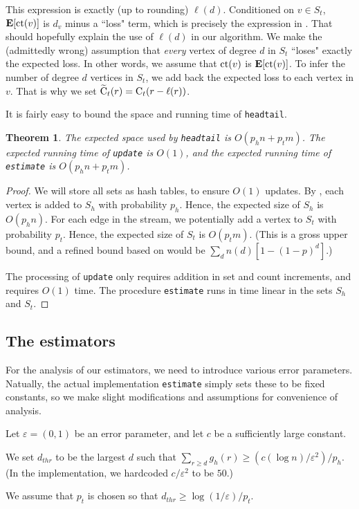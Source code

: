 \documentclass[11pt]{article}
\newtheorem{theorem}{Theorem}
\theoremstyle{definition}
\newcommand{\EX}{\hbox{\bf E}}
\def\eps{\varepsilon}
\newcommand{\C}{\hbox{C}}
\newcommand{\tC}{\widetilde{\hbox{C}}}
\newcommand{\ct}{\hbox{ct}}
\newcommand{\degdist}{{\tt headtail}}
\newcommand{\update}{{\tt update}}
\newcommand{\est}{{\tt estimate}}
\begin{document}
This expression is exactly (up to rounding) $\ell(d)$.
Conditioned on $v \in S_t$, $\EX[\ct(v)]$ is $d_v$ minus a ``loss" term, which is precisely
the expression in . That should hopefully explain the use of $\ell(d)$ in our algorithm.
We make the (admittedly wrong) assumption that \emph{every} vertex of degree $d$ in $S_t$
``loses" exactly the expected loss. In other words, we assume that $\ct(v)$ is $\EX[\ct(v)]$.
To infer the number of degree $d$ vertices in $S_t$, we add back the expected loss
to each vertex in $v$. That is why we set $\tC_t(r) = \C_t(r-\ell(r))$.

\medskip

It is fairly easy to bound the space and running time of \degdist.

\begin{theorem} \label{thm:time} The expected space used by \degdist{} is $O(p_h n + p_t m)$.
The expected running time of \update{} is $O(1)$, and the expected running time of \est{} is $O(p_h n + p_t m)$.
\end{theorem}

\begin{proof} We will store all sets as hash tables, to ensure $O(1)$ updates.
By , each vertex is added to $S_h$ with probability $p_h$. Hence, the expected size
of $S_h$ is $O(p_h n)$. For each edge in the stream, we potentially add a vertex
to $S_t$ with probability $p_t$. Hence, the expected size of $S_t$ is $O(p_t m)$. (This is a gross
upper bound, and a refined bound based on  would be $\sum_d n(d) [1-(1-p)^d]$.)

The processing of \update{} only requires addition in set and count increments,
and requires $O(1)$ time. The procedure \est{} runs in time linear in the sets $S_h$ and $S_t$.
\end{proof}


\subsection{The estimators} \label{sec:est}

For the analysis of our estimators, we need to introduce various error parameters. Natually,
the actual implementation \est{} simply sets these to be fixed constants, so we make
slight modifications and assumptions for convenience of analysis.

Let $\eps = (0,1)$ be an error parameter, and let $c$ be a sufficiently large constant.
\begin{asparaitem}
    \item We set $d_{thr}$ to be the largest $d$ such that $\sum_{r \geq d} g_h(r) \geq (c(\log n)/\eps^2)/p_h$.
    (In the implementation, we hardcoded $c/\eps^2$ to be $50$.)
    \item We assume that $p_t$ is chosen so that $d_{thr} \geq \log(1/\eps)/p_t$.
\end{asparaitem}
\end{document}
